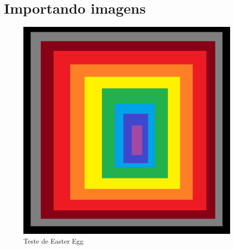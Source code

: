 \chapter{Importando imagens} %

\begin{figure}
  \centering
  \caption{Teste de Easter Egg}
  \includegraphics[scale=0.5]{files/img/Codificacao/teste.png}

  \legend{\selfAuthor}
\end{figure}
